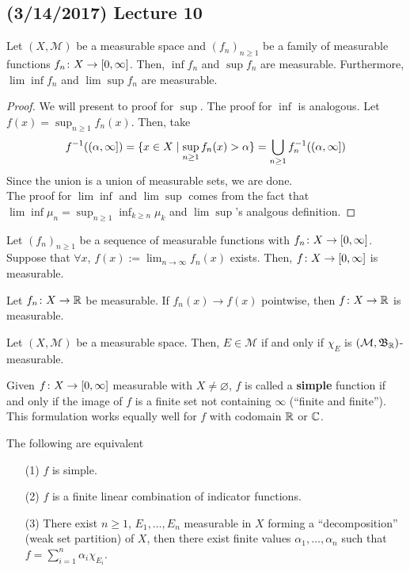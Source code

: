 \documentclass[11pt,leqno,oneside]{amsbook}
\numberwithin{thm}{section}
\newcommand{\M}{\mathcal{M}} %
\renewcommand{\emptyset}{\varnothing}
\renewcommand{\de}{\textbf} %
\begin{document}
 \subsection*{(3/14/2017) Lecture 10}
 \begin{prop}
   Let $(X,\M)$ be a measurable space and $(f_n)_{n \geq 1}$ be a
   family of measurable functions $f_n \colon X \to [0,\infty]$. Then, $\inf f_n$ and $\sup f_n$ are
   measurable. Furthermore, $\lim \inf f_n$ and $\lim \sup f_n$ are measurable.
 \end{prop}
 \begin{proof}
   We will present to proof for $\sup$. The proof for $\inf$ is
   analogous. Let $f(x) = \sup_{n \geq 1} f_n(x)$. Then, take \[
     f^{-1}((\alpha,\infty]) = \{x \in X \mid \sup_{n \geq 1} f_n(x) >
     \alpha\} = \bigcup_{n \geq 1} f_n^{-1}((\alpha,\infty])
   \]
   Since the union is a union of measurable sets, we are done. \\

   The proof for $\lim \inf$ and $\lim \sup$ comes from the fact that
   $\lim \inf \mu_n = \sup_{n \geq 1} \inf_{k \geq n} \mu_k$ and $\lim
   \sup$'s analgous definition.
 \end{proof}
 \begin{cor}
   Let $(f_n)_{n \geq 1}$ be a sequence of measurable functions with
   $f_n \colon X \to [0, \infty]$. Suppose that $\forall x$, $f(x) :=
   \lim_{n \to \infty} f_n(x)$ exists. Then, $f \colon X \to
   [0,\infty]$ is measurable.
 \end{cor}
 \begin{prop}
   Let $f_n \colon X \to {\mathbb R}$ be measurable. If $f_n(x) \to f(x)$
   pointwise, then $f \colon X \to {\mathbb R}$ is measurable.
 \end{prop}
 \begin{prop}
   Let $(X,\M)$ be a measurable space. Then, $E \in \M$ if and only if
   $\chi_E$ is $(\M,\B_\R)$-measurable.
 \end{prop}
 \begin{defn}
   Given $f \colon X \to [0,\infty]$ measurable with $X \neq
   \emptyset$, $f$ is called a \de{simple} function if and only if the
   image of $f$ is a finite set not containing $\infty$ (``finite and
   finite''). This formulation works equally well for $f$ with
   codomain ${\mathbb R}$ or ${\mathbb C}$.
 \end{defn}
 \begin{prop}
   The following are equivalent
   \begin{enumerate}
   \item[(1)] $f$ is simple.
   \item[(2)] $f$ is a finite linear combination of indicator functions.
   \item[(3)] There exist $n \geq 1$, $E_1, \ldots, E_n$ measurable in $X$
     forming a ``decomposition'' (weak set partition) of $X$, then
     there exist finite values $\alpha_1, \ldots, \alpha_n$ such that
     $f = \sum_{i=1}^n \alpha_i \chi_{E_i}$.
   \end{enumerate}
 \end{prop}
\end{document}
